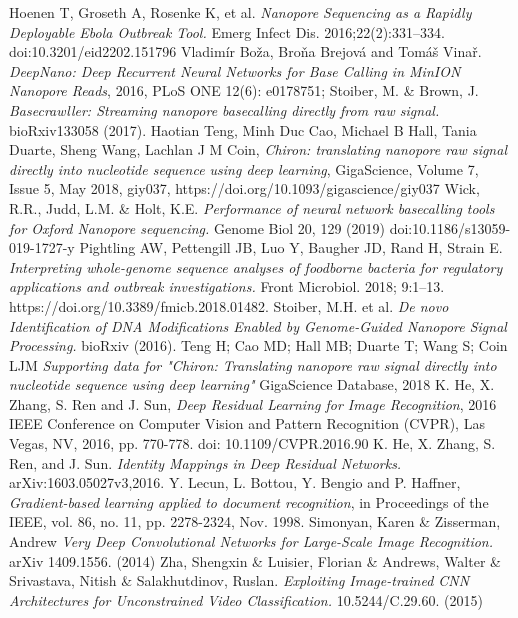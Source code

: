 \documentclass[a4paper,11pt,twoside]{report}
\theoremstyle{definition}
\begin{document}
\begin{thebibliography}{49}
 Hoenen T, Groseth A, Rosenke K, et al. \emph{Nanopore Sequencing as a Rapidly Deployable Ebola Outbreak Tool.} Emerg Infect Dis. 2016;22(2):331–334. doi:10.3201/eid2202.151796
Vladimír Boža, Broňa Brejová and Tomáš Vinař.
\emph{DeepNano: Deep Recurrent Neural Networks for Base Calling in MinION Nanopore Reads}, 2016, PLoS ONE 12(6): e0178751;
Stoiber, M. \& Brown, J. \emph{Basecrawller: Streaming nanopore basecalling directly from raw signal.} bioRxiv133058 (2017).
 Haotian Teng, Minh Duc Cao, Michael B Hall, Tania Duarte, Sheng Wang, Lachlan J M Coin, \emph{Chiron: translating nanopore raw signal directly into nucleotide sequence using deep learning}, GigaScience, Volume 7, Issue 5, May 2018, giy037, https://doi.org/10.1093/gigascience/giy037
Wick, R.R., Judd, L.M. \& Holt, K.E. \emph{Performance of neural network basecalling tools for Oxford Nanopore sequencing.} Genome Biol 20, 129 (2019) doi:10.1186/s13059-019-1727-y
Pightling AW, Pettengill JB, Luo Y, Baugher JD, Rand H, Strain E. \emph{Interpreting whole-genome sequence analyses of foodborne bacteria for regulatory applications and outbreak investigations.} Front Microbiol. 2018; 9:1–13. https://doi.org/10.3389/fmicb.2018.01482.
Stoiber, M.H. et al. \emph{De novo Identification of DNA Modifications Enabled by Genome-Guided Nanopore Signal Processing.} bioRxiv (2016).
 Teng H; Cao MD; Hall MB; Duarte T; Wang S; Coin LJM \emph{Supporting data for "Chiron: Translating nanopore raw signal directly into nucleotide sequence using deep learning"} GigaScience Database, 2018
 K. He, X. Zhang, S. Ren and J. Sun, \emph{Deep Residual Learning for Image Recognition}, 2016 IEEE Conference on Computer Vision and Pattern Recognition (CVPR), Las Vegas, NV, 2016, pp. 770-778. doi: 10.1109/CVPR.2016.90
K. He, X. Zhang, S. Ren, and J. Sun. \emph{Identity Mappings in Deep Residual Networks.} arXiv:1603.05027v3,2016.
Y. Lecun, L. Bottou, Y. Bengio and P. Haffner, \emph{Gradient-based learning applied to document recognition}, in Proceedings of the IEEE, vol. 86, no. 11, pp. 2278-2324, Nov. 1998.
Simonyan, Karen \& Zisserman, Andrew \emph{Very Deep Convolutional Networks for Large-Scale Image Recognition.} arXiv 1409.1556. (2014)
 Zha, Shengxin \& Luisier, Florian \& Andrews, Walter \& Srivastava, Nitish \& Salakhutdinov, Ruslan. \emph{Exploiting Image-trained CNN Architectures for Unconstrained Video Classification.} 10.5244/C.29.60. (2015)

\end{thebibliography}
\end{document}
